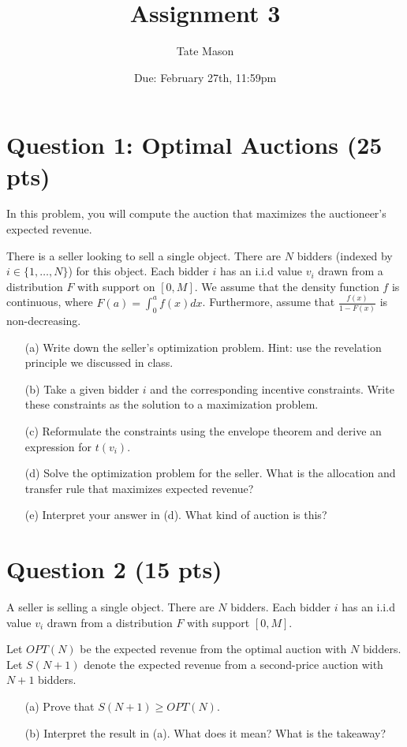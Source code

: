 \documentclass[10pt,a4paper]{article}
\begin{document}
\title{Assignment 3}
\author{Tate Mason}
\date{Due: February 27th, 11:59pm}
\maketitle

\section*{Question 1: Optimal Auctions (25 pts)}
In this problem, you will compute the auction that maximizes the auctioneer’s expected revenue.

There is a seller looking to sell a single object. There are $N$ bidders (indexed by $i \in \{1, \dots, N\}$) for this object. Each bidder $i$ has an i.i.d value $v_i$ drawn from a distribution $F$ with support on $[0,M]$. We assume that the density function $f$ is continuous, where $F(a) = \int_{0}^{a} f(x)dx$. Furthermore, assume that $\frac{f(x)}{1-F(x)}$ is non-decreasing.

\begin{enumerate}
    \item[(a)] Write down the seller’s optimization problem. Hint: use the revelation principle we discussed in class.
    \item[(b)] Take a given bidder $i$ and the corresponding incentive constraints. Write these constraints as the solution to a maximization problem.
    \item[(c)] Reformulate the constraints using the envelope theorem and derive an expression for $t(v_i)$.
    \item[(d)] Solve the optimization problem for the seller. What is the allocation and transfer rule that maximizes expected revenue?
    \item[(e)] Interpret your answer in (d). What kind of auction is this?
\end{enumerate}

\section*{Question 2 (15 pts)}
A seller is selling a single object. There are $N$ bidders. Each bidder $i$ has an i.i.d value $v_i$ drawn from a distribution $F$ with support $[0,M]$.

Let $OPT(N)$ be the expected revenue from the optimal auction with $N$ bidders. Let $S(N+1)$ denote the expected revenue from a second-price auction with $N+1$ bidders.
\begin{enumerate}
    \item[(a)] Prove that $S(N+1) \geq OPT(N)$.
    \item[(b)] Interpret the result in (a). What does it mean? What is the takeaway?
\end{enumerate}
\end{document}
